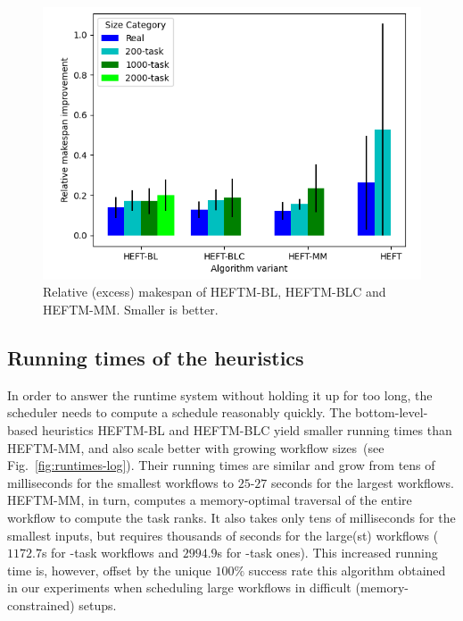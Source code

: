 \documentclass[conference]{IEEEtran}
\newcommand{\algo}[1]{\textsc{#1}}
\newcommand{\heftmm}{\algo{HEFTM-MM}\xspace}
\newcommand{\heftbl}{\algo{HEFTM-BL}\xspace}
\newcommand{\heftblc}{\algo{HEFTM-BLC}\xspace}
\begin{document}
\begin{figure}[tb]
    \centering
    \includegraphics[width=0.95\columnwidth] {images/UpdatesMss2}
    \caption{Relative (excess) makespan of \heftbl, \heftblc and \heftmm {}. Smaller is better.}
    \label{fig:updates-ms}
    \vspace{-0.3cm}
\end{figure}


\subsection{Running times of the heuristics}
\label{sec.expe.t}
%
In order to answer the runtime system without holding it up for too long, the scheduler needs to 
compute a schedule reasonably quickly. %
The bottom-level-based heuristics \heftbl and \heftblc yield smaller running times than \heftmm, 
and also scale better with growing workflow sizes~(see Fig.~\ref{fig:runtimes-log}).
Their running times are similar and grow from tens of milliseconds for the smallest workflows to 
$25$-$27$ seconds for the largest workflows.
\heftmm, in turn, computes a memory-optimal traversal of the entire workflow to compute the task ranks. 
It also takes only tens of milliseconds for the smallest inputs, but requires
thousands of seconds for the large(st) workflows ($1172.7$s for -task workflows and
$2994.9$s for -task ones).
This increased running time is, however, offset by the unique $100\%$ success rate this algorithm 
obtained in our experiments when scheduling large workflows in difficult (memory-constrained) setups.
\end{document}
